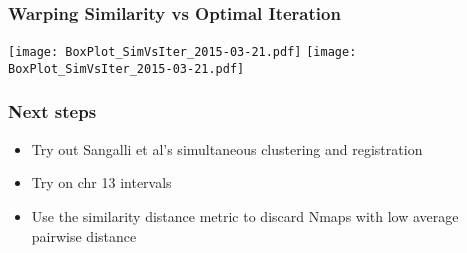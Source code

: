 \documentclass[10pt,dvipsnames,table]{beamer}
\begin{document}
\begin{frame}
\frametitle{Warping Similarity vs Optimal Iteration}
\begin{center}
\texttt{[image: BoxPlot\_SimVsIter\_2015-03-21.pdf]} 
\texttt{[image: BoxPlot\_SimVsIter\_2015-03-21.pdf]} 
\end{center}
\end{frame}

\begin{frame}
\frametitle{Next steps}
\begin{itemize}
\item Try out Sangalli et al's simultaneous clustering and registration
\item Try on chr 13 intervals
\item Use the similarity distance metric to discard Nmaps with low average pairwise distance
\end{itemize}
\end{frame}
\end{document}
